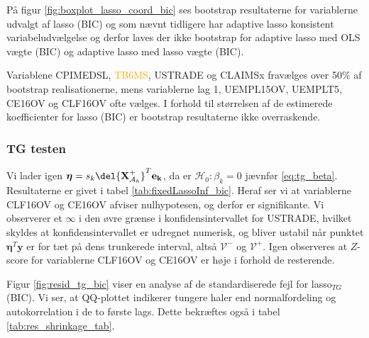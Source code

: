 På figur \ref{fig:boxplot_lasso_coord_bic} ses bootstrap resultaterne for variablerne udvalgt af lasso (BIC) og som nævnt tidligere har adaptive lasso konsistent variabeludvælgelse og derfor laves der ikke bootstrap for adaptive lasso med OLS vægte (BIC) og adaptive lasso med lasso vægte (BIC). 

Variablene \textcolor{cadetblue2}{CPIMEDSL}, \textcolor{orange}{TB6MS}, \textcolor{blue3}{USTRADE} og \textcolor{blue3}{CLAIMSx} fravælges over 50\% af bootstrap realisationerne, mens variablerne \textcolor{blue3}{lag 1}, \textcolor{blue3}{UEMPL15OV}, \textcolor{blue3}{UEMPLT5}, \textcolor{blue3}{CE16OV} og \textcolor{blue3}{CLF16OV} ofte vælges.
I forhold til størrelsen af de estimerede koefficienter for lasso (BIC) er bootstrap resultaterne ikke overraskende. 

\subsubsection{TG testen}
Vi lader igen $\boldsymbol{\eta} = s_k \del{\textbf{X}^+_{\mathcal{A}_k}}^T \mathbf{e_k}$, da er $\mathcal{H}_0: \beta_k = 0$ jævnfør \ref{eq:tg_beta}. 
Resultaterne er givet i tabel \ref{tab:fixedLassoInf_bic}.
Heraf ser vi at variablerne \textcolor{blue3}{CLF16OV} og \textcolor{blue3}{CE16OV} afviser nulhypotesen, og derfor er signifikante.
Vi observerer et $\infty$ i den øvre grænse i konfidensintervallet for \textcolor{blue3}{USTRADE}, hvilket skyldes at konfidensintervallet er udregnet numerisk, og bliver ustabil når punktet $\boldsymbol\eta^T \mathbf{y}$ er for tæt på dens trunkerede interval, altså $\mathcal{V}^-$ og $\mathcal{V}^+$. 
Igen observeres at $Z$-score for variablerne \textcolor{blue3}{CLF16OV} og \textcolor{blue3}{CE16OV} er høje i forhold de resterende. 

Figur \ref{fig:resid_tg_bic} viser en analyse af de standardiserede fejl for lasso$_{TG}$ (BIC). Vi ser, at QQ-plottet indikerer tungere haler end normalfordeling og autokorrelation i de to første lags. 
Dette bekræftes også i tabel \ref{tab:res_shrinkage_tab}.




